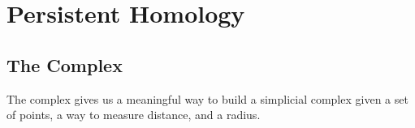 \section{Persistent Homology}\label{sec:persistent-homology}

\subsection{The \cech Complex}\label{sec:cech-complex}

The \cech complex gives us a meaningful way to build a simplicial complex given a set of points, a way to measure distance, and a radius.


\lightgray{





}
